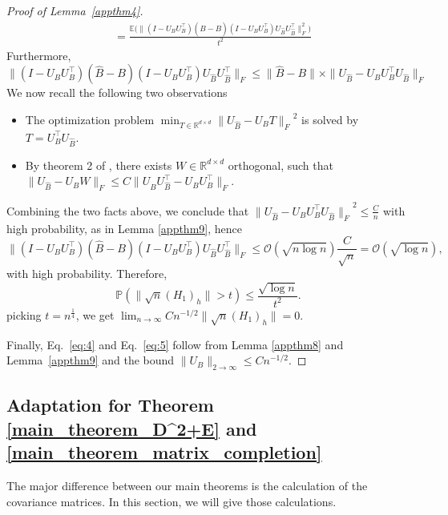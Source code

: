 \begin{proof}[Proof of Lemma~\ref{appthm4}]
\begin{align*}
    & = \frac{\mathbb{E}\bigl(\| (I -U_B U_B^{\top}) (\hat{B} - B) (I -U_B U_B^{\top}) U_{\hat{B}} U_{\hat{B}}^{\top} \|_F^2\bigr)}{t^2}
  \end{align*}
  Furthermore,
  $$\| (I -U_B U_B^{\top}) (\hat{B} - B) (I -U_B U_B^{\top}) U_{\hat{B}} U_{\hat{B}}^{\top} \|_F \leq \| \hat{B} - B \| \times \|U_{\hat{B}} -U_B U_B^{\top} U_{\hat{B}} \|_F $$
  We now recall the following two observations
  \begin{itemize}
    \item The optimization problem $\min_{T \in \mathbb{R}^{d \times d}} {\| U_{\hat{B}} - U_B T\|_F}^2$ is solved by $T = U_B^{\top} U_{\hat{B}}.$
    \item By theorem 2 of \cite{vD-K}, there exists $W \in \mathbb{R}^{d \times d}$ orthogonal, such that $\| U_{\hat{B}} - U_B W\|_F \leq  
    C \| {U_{\hat{B}}} U_{\hat{B}}^{\top} - U_B U_B^{\top} \|_F.$
  \end{itemize}
  Combining the two facts above, we conclude that
   ${\| U_{\hat{B}} - U_B U_B^{\top} U_{\hat{B}} \|_F}^2  \leq \frac{C}{n}$ with high probability, as in Lemma \ref{appthm9}, hence 
  $$\| (I -U_B U_B^{\top}) (\hat{B} - B) (I -U_B U_B^{\top}) U_{\hat{B}} U_{\hat{B}}^{\top} \|_F \leq \mathcal{O}(\sqrt{n \log n}) \frac{C}{\sqrt{n}} = \mathcal{O}(\sqrt{\log n}),$$
  with high probability. Therefore,
  $$\mathbb{P} (\|\sqrt{n} (H_1)_h \| > t) \leq \frac{\sqrt{\log n}}{t^2}.$$
  picking $t=n^{\frac{1}{4}}$, we get $\lim_{n \rightarrow \infty} Cn^{-1/2} \|\sqrt{n} (H_1)_h\| = 0.$

Finally, Eq.~\eqref{eq:4} and Eq.~\eqref{eq:5} follow from Lemma \ref{appthm8} and Lemma~\ref{appthm9} and the bound $\| U_B\|_{2 \to \infty} \leq C n^{-1/2}$.
\end{proof}  

\subsection{Adaptation for Theorem \ref{main_theorem_D^2+E} and \ref{main_theorem_matrix_completion}}
The major difference between our main theorems is the calculation of the covariance matrices. In this section, we will give those calculations.

